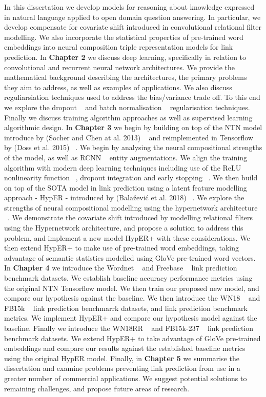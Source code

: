 In this dissertation we develop models for reasoning about knowledge expressed in natural language applied to open domain question answering. In particular, we develop compensate for covariate shift introduced in convolutional relational filter modelling. We also incorporate the statistical properties of pre-trained word embeddings into neural composition triple representation models for link prediction. \newline
In \textbf{Chapter 2} we discuss deep learning, specifically in relation to convolutional and recurrent neural network architectures. We provide the mathematical background describing the architectures, the primary problems they aim to address, as well as examples of applications. We also discuss reguliarsiation techniques used to address the bias/variance trade off. To this end we explore the dropout ~\citep{srivastava2014dropout} and batch normalisation ~\citep{ioffe2015batch} regularisation techniques. Finally we discuss training algorithm approaches as well as supervised learning algorithmic design.  \newline
In \textbf{Chapter 3} we begin by building on top of the NTN model introduce by (Socher and Chen at al. 2013) ~\citep{NIPS2013_5028} and reimplemented in Tensorflow by (Doss et al. 2015) ~\citep{Doss2015}. We begin by analysing the neural compositional strengths of the model, as well as RCNN ~\citep{socher2012semantic} entity augmentations.  We align the training algorithm with modern deep learning techniques including use of the ReLU nonlinearity function ~\citep{xu2015empirical}, dropout integration and early stopping ~\citep{prechelt1998early}. We then build on top of the SOTA model in link prediction using a latent feature modelling approach - HypER - introduced by (Bala\v{z}evi\'c et al. 2018) ~\citep{balazevic2019hypernetwork}. We explore the strengths of neural compositional modelling using the hypernetwork architecture ~\citep{ha2016hypernetworks}. We demonstrate the covariate shift introduced by modelling relational filters using the Hypernetwork architecture, and propose a solution to address this problem, and implement a new model HypER+ with these considerations. We then extend HypER+ to make use of pre-trained word embeddings, taking advantage of semantic statistics modelled using GloVe pre-trained word vectors. \newline
In \textbf{Chapter 4} we introduce the Wordnet ~\citep{miller1995wordnet} and Freebase ~\citep{bollacker2008freebase} link prediction benchmark datasets. We establish baseline accuracy performance metrics using the original NTN Tensorflow model. We then train our proposed new model, and compare our hypothesis against the baseline. We then introduce the WN18 ~\citep{bordes2014semantic} and FB15k ~\citep{bordes2013translating} link prediction benchmarrk datasets, and link prediction benchmark metrics. We implement HypER+ and compare our hypothesis model against the baseline. Finally we introduce the WN18RR ~\citep{dettmers2018convolutional} and FB15k-237 ~\citep{toutanova2015observed} link prediction benchmark datasets. We extend HypER+ to take advantage of GloVe pre-trained embeddings and compare our results against the established baseline metrics using the original HypER model. \newline
Finally, in \textbf{Chapter 5} we summarise the dissertation and examine problems preventing link prediction from use in a greater number of commercial applications. We suggest potential solutions to remaining challenges, and propose future areas of research.



